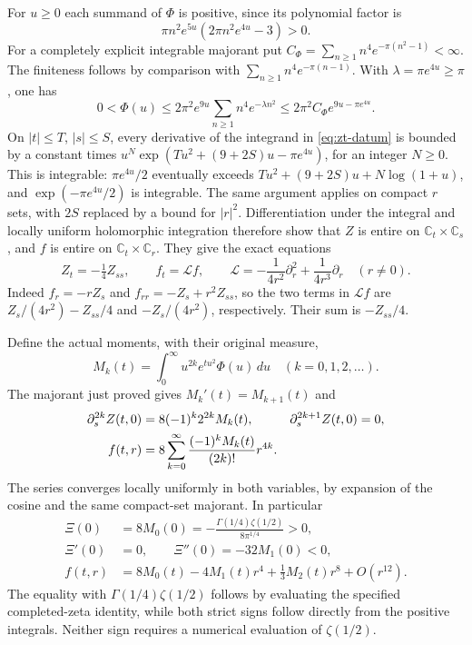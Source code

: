 For $u\geq0$ each summand of $\Phi$ is positive, since its polynomial
factor is
\[
 \pi n^2 e^{5u}(2\pi n^2e^{4u}-3)>0.
\]
For a completely explicit integrable majorant put
$C_\Phi=\sum_{n\geq1}n^4e^{-\pi(n^2-1)}<\infty$.
The finiteness follows by comparison with
$\sum_{n\geq1}n^4e^{-\pi(n-1)}$.  With
$\lambda=\pi e^{4u}\geq\pi$, one has
\[
 0<\Phi(u)\leq2\pi^2 e^{9u}
 \sum_{n\geq1}n^4e^{-\lambda n^2}
 \leq2\pi^2C_\Phi e^{9u-\pi e^{4u}}.
\]
On $|t|\leq T$, $|s|\leq S$, every derivative of the integrand in
\eqref{eq:zt-datum} is bounded by a constant times
$u^N\exp(Tu^2+(9+2S)u-\pi e^{4u})$, for an integer $N\geq0$.
This is integrable: $\pi e^{4u}/2$ eventually exceeds
$Tu^2+(9+2S)u+N\log(1+u)$, and
$\exp(-\pi e^{4u}/2)$ is integrable.  The same argument applies on
compact $r$ sets, with $2S$ replaced by a bound for $|r|^2$.
Differentiation under the integral and locally uniform holomorphic
integration therefore show that $Z$ is entire on $\mathbb C_t\times
\mathbb C_s$, and $f$ is entire on $\mathbb C_t\times\mathbb C_r$.
They give the exact equations
\begin{equation}
 Z_t=-\tfrac14 Z_{ss},\qquad
 f_t=\mathcal L f,\qquad
 \mathcal L=-\frac1{4r^2}\partial_r^2+
                 \frac1{4r^3}\partial_r\quad(r\ne0).
 \label{eq:zt-heat}
\end{equation}
Indeed $f_r=-rZ_s$ and $f_{rr}=-Z_s+r^2Z_{ss}$, so the two terms
in $\mathcal Lf$ are $Z_s/(4r^2)-Z_{ss}/4$ and
$-Z_s/(4r^2)$, respectively.  Their sum is $-Z_{ss}/4$.

Define the actual moments, with their original measure,
\[
 M_k(t)=\int_0^\infty u^{2k}e^{tu^2}\Phi(u)\,du
 \quad(k=0,1,2,\ldots).
\]
The majorant just proved gives $M_k'(t)=M_{k+1}(t)$ and
\begin{align}
 \partial_s^{2k}Z(t,0)&=8(-1)^k2^{2k}M_k(t),&
 \partial_s^{2k+1}Z(t,0)&=0,\notag\\
 f(t,r)&=8\sum_{k=0}^{\infty}
          \frac{(-1)^kM_k(t)}{(2k)!}r^{4k}.
 \label{eq:zt-moments}
\end{align}
The series converges locally uniformly in both variables, by expansion
of the cosine and the same compact-set majorant.  In particular
\begin{align*}
 \Xi(0)&=8M_0(0)
     =-\frac{\Gamma(1/4)\zeta(1/2)}{8\pi^{1/4}}>0,\\
 \Xi'(0)&=0,\qquad \Xi''(0)=-32M_1(0)<0,\\
 f(t,r)&=8M_0(t)-4M_1(t)r^4+\tfrac13M_2(t)r^8+O(r^{12}).
\end{align*}
The equality with $\Gamma(1/4)\zeta(1/2)$ follows by evaluating the
specified completed-zeta identity, while both strict signs follow
directly from the positive integrals.  Neither sign requires a numerical
evaluation of $\zeta(1/2)$.

